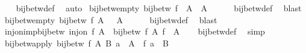 \begin{isabellebody}
%
\isadelimproof
\ \ %
\endisadelimproof
%
\isatagproof
{}\isamarkupfalse%
\ bij{\isacharunderscore}{\kern0pt}betw{\isacharunderscore}{\kern0pt}def\ \isamarkupfalse%
\ auto%
\endisatagproof
{\isafoldproof}%
%
\isadelimproof
\isanewline
%
\endisadelimproof
\isanewline
{}\isamarkupfalse%
\ bij{\isacharunderscore}{\kern0pt}betw{\isacharunderscore}{\kern0pt}empty{}{\isacharcolon}{\kern0pt}\ {\isachardoublequoteopen}bij{\isacharunderscore}{\kern0pt}betw\ f\ {\isacharbraceleft}{\kern0pt}{\isacharbraceright}{\kern0pt}\ A\ {\isasymLongrightarrow}\ A\ {\isacharequal}{\kern0pt}\ {\isacharbraceleft}{\kern0pt}{\isacharbraceright}{\kern0pt}{\isachardoublequoteclose}\isanewline
%
\isadelimproof
\ \ %
\endisadelimproof
%
\isatagproof
{}\isamarkupfalse%
\ bij{\isacharunderscore}{\kern0pt}betw{\isacharunderscore}{\kern0pt}def\ \isamarkupfalse%
\ blast%
\endisatagproof
{\isafoldproof}%
%
\isadelimproof
\isanewline
%
\endisadelimproof
\isanewline
{}\isamarkupfalse%
\ bij{\isacharunderscore}{\kern0pt}betw{\isacharunderscore}{\kern0pt}empty{}{\isacharcolon}{\kern0pt}\ {\isachardoublequoteopen}bij{\isacharunderscore}{\kern0pt}betw\ f\ A\ {\isacharbraceleft}{\kern0pt}{\isacharbraceright}{\kern0pt}\ {\isasymLongrightarrow}\ A\ {\isacharequal}{\kern0pt}\ {\isacharbraceleft}{\kern0pt}{\isacharbraceright}{\kern0pt}{\isachardoublequoteclose}\isanewline
%
\isadelimproof
\ \ %
\endisadelimproof
%
\isatagproof
{}\isamarkupfalse%
\ bij{\isacharunderscore}{\kern0pt}betw{\isacharunderscore}{\kern0pt}def\ \isamarkupfalse%
\ blast%
\endisatagproof
{\isafoldproof}%
%
\isadelimproof
\isanewline
%
\endisadelimproof
\isanewline
{}\isamarkupfalse%
\ inj{\isacharunderscore}{\kern0pt}on{\isacharunderscore}{\kern0pt}imp{\isacharunderscore}{\kern0pt}bij{\isacharunderscore}{\kern0pt}betw{\isacharcolon}{\kern0pt}\ {\isachardoublequoteopen}inj{\isacharunderscore}{\kern0pt}on\ f\ A\ {\isasymLongrightarrow}\ bij{\isacharunderscore}{\kern0pt}betw\ f\ A\ {\isacharparenleft}{\kern0pt}f\ {\isacharbackquote}{\kern0pt}\ A{\isacharparenright}{\kern0pt}{\isachardoublequoteclose}\isanewline
%
\isadelimproof
\ \ %
\endisadelimproof
%
\isatagproof
{}\isamarkupfalse%
\ bij{\isacharunderscore}{\kern0pt}betw{\isacharunderscore}{\kern0pt}def\ \isamarkupfalse%
\ simp%
\endisatagproof
{\isafoldproof}%
%
\isadelimproof
\isanewline
%
\endisadelimproof
\isanewline
{}\isamarkupfalse%
\ bij{\isacharunderscore}{\kern0pt}betw{\isacharunderscore}{\kern0pt}apply{\isacharcolon}{\kern0pt}\ {\isachardoublequoteopen}{\isasymlbrakk}bij{\isacharunderscore}{\kern0pt}betw\ f\ A\ B{\isacharsemicolon}{\kern0pt}\ a\ {\isasymin}\ A{\isasymrbrakk}\ {\isasymLongrightarrow}\ f\ a\ {\isasymin}\ B{\isachardoublequoteclose}\isanewline

\end{isabellebody}
